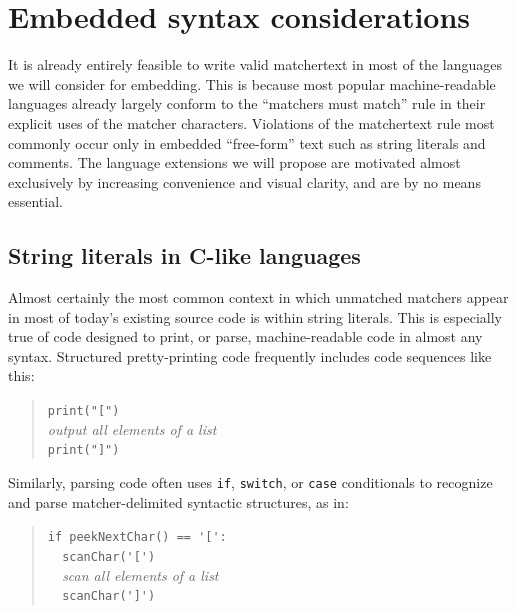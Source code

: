 \section{Embedded syntax considerations}
\label{sec:embed}


It is already entirely feasible to write valid matchertext
in most of the languages we will consider for embedding.
This is because most popular machine-readable languages
already largely conform to the ``matchers must match'' rule
in their explicit uses of the matcher characters.
Violations of the matchertext rule most commonly occur
only in embedded ``free-form'' text such as string literals and comments.
The language extensions we will propose are motivated almost exclusively
by increasing convenience and visual clarity,
and are by no means essential.

\subsection{String literals in C-like languages}
\label{sec:embed:c}

Almost certainly the most common context in which unmatched matchers
appear in most of today's existing source code is within string literals.
This is especially true of code designed to print, or parse,
machine-readable code in almost any syntax.
Structured pretty-printing code frequently includes code sequences like this:

\begin{quote}
\verb|print("[")| \\
\emph{output all elements of a list} \\
\verb|print("]")|
\end{quote}

Similarly, parsing code often uses \verb|if|, \verb|switch|,
or \verb|case| conditionals
to recognize and parse matcher-delimited syntactic structures,
as in:

\begin{quote}
\verb|if peekNextChar() == '[':| \\
\verb|  scanChar('[')| \\
\verb|  |\emph{scan all elements of a list} \\
\verb|  scanChar(']')| 
\end{quote}

